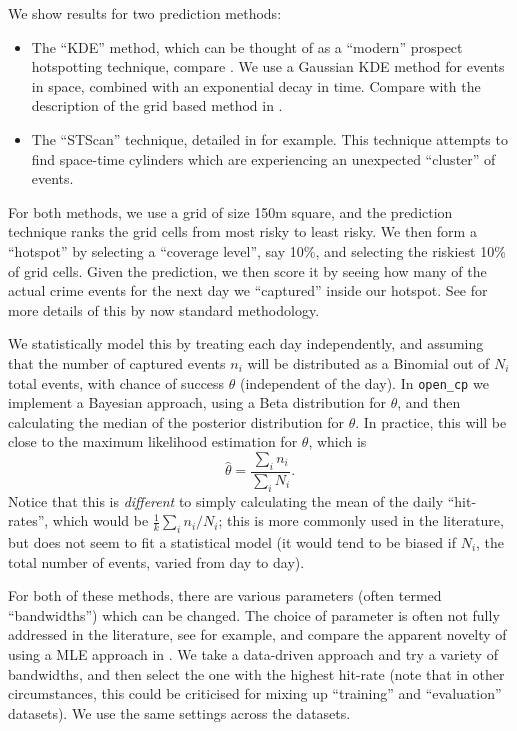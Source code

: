 \documentclass[twoside,a4paper,twocolumn,10pt]{article}
\theoremstyle{plain}
\theoremstyle{definition}
\begin{document}
We show results for two prediction methods:
\begin{itemize}
\item The ``KDE'' method, which can be thought of as a ``modern'' prospect hotspotting
technique, compare \cite{bjp}.  We use a Gaussian KDE method for events in space, combined
with an exponential decay in time.  Compare with the description of the grid based method
in \cite{rosser_nw}.
\item The ``STScan'' technique, detailed in \cite{arc} for example.  This technique attempts
to find space-time cylinders which are experiencing an unexpected ``cluster'' of events.
\end{itemize}
For both methods, we use a grid of size 150m square, and the prediction technique ranks the
grid cells from most risky to least risky.  We then form a ``hotspot'' by selecting a
``coverage level'', say 10\%, and selecting the riskiest 10\% of grid cells.  Given the prediction,
we then score it by seeing how many of the actual crime events for the next day we ``captured''
inside our hotspot.  See \cite{arc, bjp} for more details of this by now standard methodology.

We statistically model this by treating each day independently, and assuming that the number of
captured events $n_i$ will be distributed as a Binomial out of $N_i$ total events, with chance
of success $\theta$ (independent of the day).  In \texttt{open\_cp} we implement a Bayesian
approach, using a Beta distribution for $\theta$, and then calculating the median of the posterior
distribution for $\theta$.  In practice, this will be close to the maximum likelihood estimation
for $\theta$, which is
\[ \hat\theta = \frac{\sum_i n_i}{\sum_i N_i}. \]
Notice that this is \emph{different} to simply calculating the mean of the daily ``hit-rates'',
which would be $\frac1k \sum_i n_i / N_i$; this is more commonly used in the literature, but
does not seem to fit a statistical model (it would tend to be biased if $N_i$, the total
number of events, varied from day to day).

For both of these methods, there are various parameters (often termed ``bandwidths'') which can
be changed.  The choice of parameter is often not fully addressed in the literature, see
\cite{arc} for example, and compare the apparent novelty of using a MLE approach in
\cite{rosser_nw}.  We take a data-driven approach and try a variety of bandwidths, and
then select the one with the highest hit-rate (note that in other circumstances, this
could be criticised for mixing up ``training'' and ``evaluation'' datasets).  We use the same
settings across the datasets.
\end{document}
